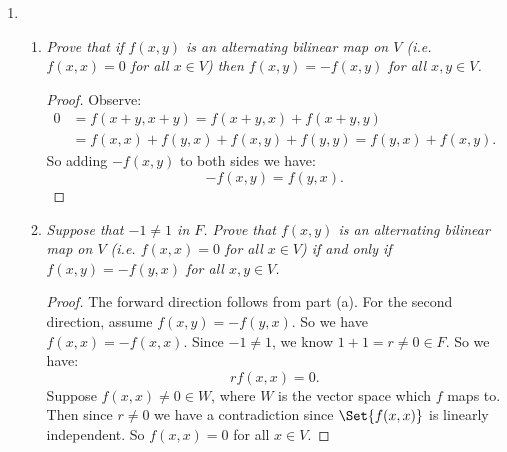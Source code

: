 \documentclass[9pt,reqno,twoside]{amsbook}
\theoremstyle{plain}
\numberwithin{section}{chapter}
\numberwithin{equation}{chapter}
\theoremstyle{definition}
\theoremstyle{remark}
\theoremstyle{plain}
\newcommand{\mc}{\mathcal}
\newcommand{\bee}{\begin{equation}\begin{aligned}}
\newcommand{\eee}{\end{aligned}\end{equation}}
\newcommand{\tens}{\otimes}
\renewcommand{\leq}{\leqslant}
\begin{document}
\begin{enumerate}[label=\arabic*.]
\begin{comment}

\begin{proof}
Recall $T = \mc{T}^k(M) = M \tens \cdots \tens M$. Then we have a basis for $T$ given by: 
$$
B = \Set{m_{i_1} \tens \cdots \tens m_{i_n}: 1 \leq i_j \leq n},
$$
and $m_i = (0,...0,1,0,...,0) \in M$ where the $1$ is in the $i$-th position, the $i$-th standard basis vector of $M$. Recall: 
$$
L = \Lambda^k(M) = \mc{T}^k(M)/\mc{A}^k(M) = T/A.
$$
Now let $\pi:T \to L$ be the natural projection homomorphism given by:
$$\pi(v_1 \tens \cdots \tens v_n) = (v_1 \tens \cdots \tens v_n) \mod A.
$$
Now note that $B/A$ generates $L$. We conjecture that $B/A$ is linearly independent, and thus a basis for $L$. So we know that $B/A$ is just the set where all $i_{j_1} \neq i_{j_2}$ for all $j_1 \neq j_2$. 
 
\end{proof}
\end{comment}

\setcounter{enumi}{11}

\item 
\begin{enumerate}
\item \textit{Prove that if $f(x,y)$ is an alternating bilinear map on $V$ (i.e. $f(x,x) = 0$ for all $x \in V$) then $f(x,y) = -f(x,y)$ for all $x,y \in V$. }

\begin{proof}
Observe: 
\bee
0 &= f(x + y,x + y) = f(x + y,x) + f(x + y,y) \\
&= f(x,x) + f(y,x)  + f(x,y) + f(y,y) = f(y,x) + f(x,y).
\eee
So adding $-f(x,y)$ to both sides we have: 
$$
-f(x,y) = f(y,x).
$$
\end{proof}

\item \textit{Suppose that $-1 \neq 1$ in $F$. Prove that $f(x,y)$ is an alternating bilinear map on $V$ (i.e. $f(x,x) = 0$ for all $x \in V$) if and only if $f(x,y) = -f(y,x)$ for all $x,y \in V$. }

\begin{proof}
The forward direction follows from part (a). For the second direction, assume $f(x,y)  = -f(y,x)$. So we have $f(x,x) = -f(x,x)$. Since $-1 \neq 1$, we know $1 + 1 = r \neq 0 \in F$. So we have: 
$$
rf(x,x) = 0.
$$
Suppose $f(x,x) \neq 0 \in W$, where $W$ is the vector space which $f$ maps to. Then since $r \neq 0$ we have a contradiction since $\Set{f(x,x)}$ is linearly independent. So $f(x,x) = 0$ for all $x \in V$. 
\end{proof}


\end{enumerate}
\end{enumerate}
\end{document}

